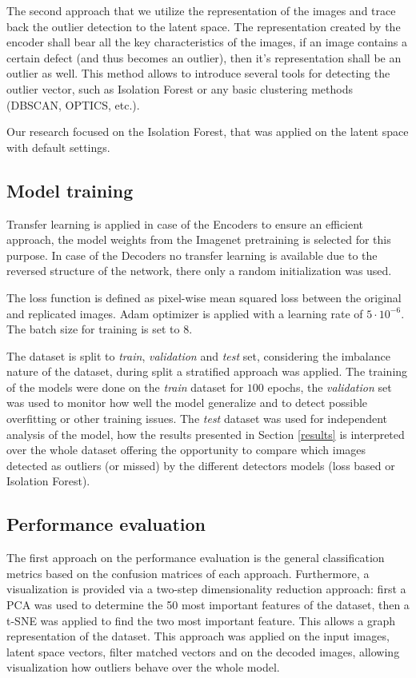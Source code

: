 The second approach that we utilize the representation of the images and trace back the outlier
detection to the latent space.
The representation created by the encoder shall bear all the key characteristics of the images,
if an image contains a certain defect (and thus becomes an outlier), then it's representation
shall be an outlier as well.
This method allows to introduce several tools for detecting the outlier vector,
such as Isolation Forest or any basic clustering methods (DBSCAN, OPTICS, etc.).

Our research focused on the Isolation Forest, that was applied on the latent space with default
settings.

\subsection{Model training}
Transfer learning is applied in case of the Encoders to ensure an efficient approach,
the model weights from the Imagenet pretraining is selected for this purpose.
In case of the Decoders no transfer learning is available due to the reversed structure
of the network, there only a random initialization was used.

The loss function is defined as pixel-wise mean squared loss between the original and replicated
images.
Adam optimizer is applied with a learning rate of $5 \cdot 10^{-6}$.
The batch size for training is set to 8.

The dataset is split to \emph{train}, \emph{validation} and \emph{test} set, considering the
imbalance nature of the dataset, during split a stratified approach was applied.
The training of the models were done on the \emph{train} dataset for $100$ epochs,
the \emph{validation} set was used to monitor how well the model generalize and to detect possible
overfitting or other training issues.
The \emph{test} dataset was used for independent analysis of the model, how the results presented
in Section \ref{results} is interpreted over the whole dataset offering the opportunity to compare
which images detected as outliers (or missed) by the different detectors models (loss based or
Isolation Forest).

\subsection{Performance evaluation}
The first approach on the performance evaluation is the general classification metrics based on
the confusion matrices of each approach.
Furthermore, a visualization is provided via a two-step dimensionality reduction approach:
first a PCA was used to determine the 50 most important features of the dataset,
then a t-SNE was applied to find the two most important feature.
This allows a graph representation of the dataset.
This approach was applied on the input images, latent space vectors, filter matched vectors and on
the decoded images, allowing visualization how outliers behave over the whole model.


